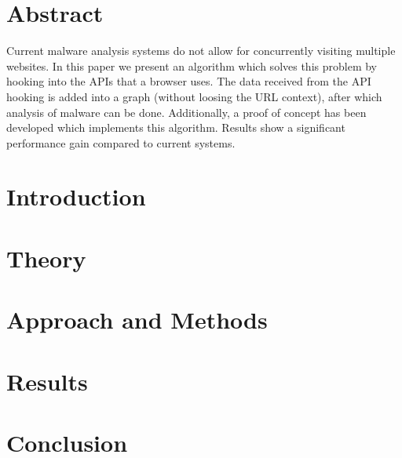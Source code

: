 \documentclass{scrartcl}
\begin{document}
\clearpage
\restoregeometry

\section*{Abstract}

Current malware analysis systems do not allow for concurrently visiting multiple websites. In this paper we present an algorithm which solves this problem by hooking into the APIs that a browser uses. The data received from the API hooking is added into a graph (without loosing the URL context), after which analysis of malware can be done. Additionally, a proof of concept has been developed which implements this algorithm. Results show a significant performance gain compared to current systems.

\clearpage

\tableofcontents

\clearpage


\section{Introduction}


\clearpage

\section{Theory}


\clearpage

\section{Approach and Methods}


\clearpage

\section{Results}


\clearpage

\section{Conclusion}

\end{document}
